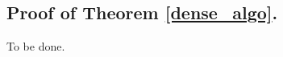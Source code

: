 \documentclass[11pt]{article}
\newcommand{\Z}{\mathbb{Z}}
\renewcommand{\O}{\mathcal{O}}
\newcommand{\set}[1]{\left\lbrace #1 \right\rbrace}
\DeclareMathOperator*{\Ham}{Ham}
\theoremstyle{plain}
\newtheorem{theorem}{Theorem}
\newtheorem{lemma}{Lemma}
\theoremstyle{definition}
\theoremstyle{remark}
\begin{document}
\subsection{Proof of Theorem \ref{dense_algo}.}
To be done.
%	
\end{document}
